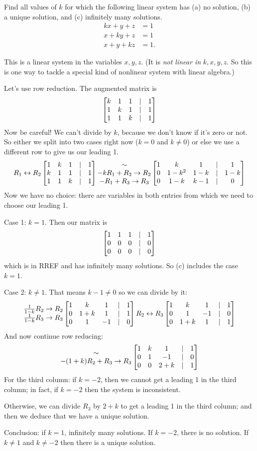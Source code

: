 \begin{myprob} Find all values of $k$ for which the following
linear system has (a) no solution, (b) a unique solution, and
(c) infinitely many solutions.
\begin{align*}
kx + y + z &=1\\
x +ky + z &= 1\\
x+y+kz &= 1.
\end{align*}

\begin{mysol}  This is a linear system in the variables $x,y,z$.  (It is
{\it not  linear in} $k,x,y,z$.  So this is one way to tackle a special
kind of nonlinear system with linear algebra.)

Let's use row reduction.  The augmented matrix is
$$
\left[ \begin{matrix} k & 1 & 1 &|& 1\\
1&k&1&|&1\\
1&1&k&|&1 \end{matrix} \right]
$$
Now be careful!  We can't divide by $k$, because we don't
know if it's zero or not.  So either we split into two
cases right now ($k=0$ and $k\neq0$) or else we use a 
different row to give us our leading 1.  
$$
\begin{matrix} R_1 \leftrightarrow R_2 \end{matrix}
\left[ \begin{matrix} 1&k&1&|&1\\
k & 1 & 1 &|& 1\\
1&1&k&|&1 \end{matrix} \right]
\begin{matrix} \sim \\ -kR_1+R_2\to R_2 \\ -R_1+R_3 \to R_3 \end{matrix}
\left[ \begin{matrix} 
1&k&1&|&1\\
0 & 1-k^2 & 1-k &|& 1-k\\
0&1-k&k-1&|&0 \end{matrix} \right]
$$
Now we have no choice:  there are variables in both entries from
which we need to choose our leading 1.  

Case 1:  $k = 1$.  Then our matrix is
$$
\left[ \begin{matrix} 
1&1&1&|&1\\
0 & 0 & 0 &|& 0\\
0&0&0&|&0 \end{matrix} \right]
$$
which is in RREF and has infinitely many solutions.  So (c) includes
the case $k=1$.

Case 2:  $k \neq 1$.  That means $k-1 \neq 0$ so we can divide by it:
$$
\begin{matrix}  \frac{1}{1-k} R_2\to R_2 \\ \frac{1}{1-k}R_3\to R_3 \end{matrix}
\left[ \begin{matrix} 
1&k&1&|&1\\
0 & 1+k & 1 &|& 1\\
0&1&-1&|&0 \end{matrix} \right]
\begin{matrix} R_2 \leftrightarrow R_3 \end{matrix}
\left[ \begin{matrix} 
1&k&1&|&1\\
0&1&-1&|&0\\
0 & 1+k & 1 &|& 1 \end{matrix} \right]
$$
And now continue row reducing:
$$
\begin{matrix} \sim \\ -(1+k)R_2+R_3\to R_3 \end{matrix}
\left[ \begin{matrix} 
1&k&1&|&1\\
0&1&-1&|&0\\
0 & 0 & 2+k &|& 1 \end{matrix} \right]
$$
For the third column:  if $k = -2$, then we cannot get a leading
1 in the third column; in fact, if $k=-2$ then the system is 
inconsistent.  

Otherwise, we can divide $R_3$ by $2+k$ to get a leading 1 in
the third column; and then we deduce that we have a unique solution.

Conclusion:  if $k=1$, infinitely many solutions.  If $k=-2$, there is no
solution.  If $k \neq 1$ and $k \neq -2$ then there is a unique
solution.
\end{mysol}\end{myprob}

